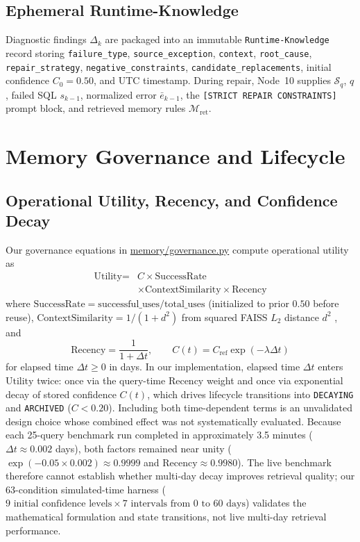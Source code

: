 \subsection{Ephemeral Runtime-Knowledge}
Diagnostic findings $\Delta_k$ are packaged into an immutable \texttt{Runtime-Knowledge} record storing \texttt{failure\_\allowbreak{}type}, \texttt{source\_\allowbreak{}exception}, \texttt{context}, \texttt{root\_\allowbreak{}cause}, \texttt{repair\_\allowbreak{}strategy}, \texttt{negative\_\allowbreak{}constraints}, \texttt{candidate\_\allowbreak{}replacements}, initial confidence $C_0 = 0.50$, and UTC timestamp. During repair, Node~10 supplies $\mathcal{S}_q$, $q$, failed SQL $s_{k-1}$, normalized error $\bar{e}_{k-1}$, the \texttt{[STRICT REPAIR CONSTRAINTS]} prompt block, and retrieved memory rules $\mathcal{M}_{\text{ret}}$.

\section{Memory Governance and Lifecycle}
\label{sec:governance}
\subsection{Operational Utility, Recency, and Confidence Decay}
\label{sec:decay_authoritative}
Our governance equations in \url{memory/governance.py} compute operational utility as
\begin{equation}
\begin{aligned}
\text{Utility} = {} & C \times \text{SuccessRate} \\
& \times \text{ContextSimilarity} \times \text{Recency}
\end{aligned}
\end{equation}
where $\text{SuccessRate} = \text{successful\_uses}/\text{total\_uses}$ (initialized to prior $0.50$ before reuse), $\text{ContextSimilarity} = 1/(1+d^2)$ from squared FAISS $L_2$ distance $d^2$ \cite{johnson2021faiss}, and
\begin{equation}
\text{Recency} = \frac{1}{1 + \Delta t}, \qquad C(t) = C_{\text{ref}} \exp(-\lambda \Delta t)
\end{equation}
for elapsed time $\Delta t \ge 0$ in days. In our implementation, elapsed time $\Delta t$ enters $\text{Utility}$ twice: once via the query-time $\text{Recency}$ weight and once via exponential decay of stored confidence $C(t)$, which drives lifecycle transitions into \texttt{DECAYING} and \texttt{ARCHIVED} ($C < 0.20$). Including both time-dependent terms is an unvalidated design choice whose combined effect was not systematically evaluated. Because each 25-query benchmark run completed in approximately 3.5 minutes ($\Delta t \approx 0.002$ days), both factors remained near unity ($\exp(-0.05 \times 0.002) \approx 0.9999$ and $\text{Recency} \approx 0.9980$). The live benchmark therefore cannot establish whether multi-day decay improves retrieval quality; our 63-condition simulated-time harness ($9\text{ initial confidence levels} \times 7\text{ intervals from 0 to 60 days}$) validates the mathematical formulation and state transitions, not live multi-day retrieval performance.

